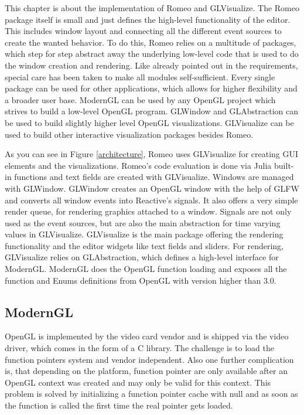 This chapter is about the implementation of Romeo and GLVisualize.
The Romeo package itself is small and just defines the high-level functionality of the editor.
This includes window layout and connecting all the different event sources to create the wanted behavior.
To do this, Romeo relies on a multitude of packages, which step for step abstract away the underlying low-level code that is used to do the window creation and rendering. 
Like already pointed out in the requirements, special care has been taken to make all modules self-sufficient. 
Every single package can be used for other applications, which allows for higher flexibility and a broader user base.
ModernGL can be used by any OpenGL project which strives to build a low-level OpenGL program.
GLWindow and GLAbstraction can be used to build slightly higher level OpenGL visualizations. 
GLVisualize can be used to build other interactive visualization packages besides Romeo.

As you can see in Figure \cref{architecture}, Romeo uses GLVisualize for creating \ac{GUI} elements and the visualizations. Romeo's code evaluation is done via Julia built-in functions and text fields are created with GLVisualize.
Windows are managed with GLWindow. 
GLWindow creates an OpenGL window with the help of GLFW and converts all window events into Reactive's signals. 
It also offers a very simple render queue, for rendering graphics attached to a window.
Signals are not only used as the event sources, but are also the main abstraction for time varying values in GLVisualize.
GLVisualize is the main package offering the rendering functionality and the editor widgets like text fields and sliders.
For rendering, GLVisualize relies on GLAbstraction, which defines a high-level interface for ModernGL.
ModernGL does the \ac{OpenGL} function loading and exposes all the function and Enums definitions from \ac{OpenGL} with version higher than 3.0.



\subsection{ModernGL}
\ac{OpenGL} is implemented by the video card vendor and is shipped via the video driver, which comes in the form of a C library.
The challenge is to load the function pointers system and vendor independent. 
Also one further complication is, that depending on the platform, function pointer are only available after an \ac{OpenGL} context was created and may only be valid for this context. \cite{wgl}
This problem is solved by initializing a function pointer cache with null and as soon as the function is called the first time the real pointer gets loaded.

